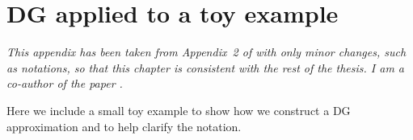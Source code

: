 \chapter{DG applied to a toy example}\label{appendix:example}
\begin{center}
    \begin{minipage}{0.8\textwidth}
        \textit{This appendix has been taken from Appendix~2 of \cite{blnos2022} with only minor changes, such as notations, so that this chapter is consistent with the rest of the thesis. I am a co-author of the paper \cite{blnos2022}.
        }
    \end{minipage}
    \end{center}
\renewcommand\thefigure{\arabic{figure}}
Here we include a small toy example to show how we construct a DG approximation and to help clarify the notation. 

